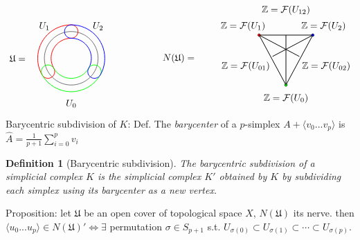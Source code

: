 \documentclass{article}
\theoremstyle{mystyle}
\newtheorem*{definition}{Definition}%
\theoremstyle{remark}
\numberwithin{equation}{section}
\begin{document}
$$
\begin{tikzpicture}
\node () at (-2,0.) {$\mathfrak{U}=$};
\draw (0,0) circle (1);
%
\draw[red,line width=0.25mm] (0,0.75) arc (90:210:0.75);
\draw[red,line width=0.25mm] (0,1.25) arc (90:210:1.25);
\draw[red,line width=0.25mm] (0,1.25) arc (90:-90:0.25);
\draw[red,line width=0.25mm] (-1.0825317,-0.625) arc (210:390:0.25);
%
\draw[green,line width=0.25mm] (-1.0825317,-0.625) arc (210:330:1.25);
\draw[green,line width=0.25mm] (-0.649519,-0.375) arc (210:330:0.75);
\draw[green,line width=0.25mm] (1.0825317,-0.625) arc (-30:150:0.25);
\draw[green,line width=0.25mm] (-1.0825317,-0.625) arc (210:30:0.25);
%
\draw[blue,line width=0.25mm] (0,0.75) arc (90:-30:0.75);
\draw[blue,line width=0.25mm] (0,1.25) arc (90:-30:1.25);
\draw[blue,line width=0.25mm] (0,1.25) arc (90:270:0.25);
\draw[blue,line width=0.25mm] (1.0825317,-0.625) arc (330:150:0.25);
\node () at (4,0.) {$N(\mathfrak{U})=$};
\draw[line width=0.25mm] (-1+8,0.866)--(1+8,0.866);
\draw[line width=0.25mm] (-1+8,0.866)--(8,-1);
\draw[line width=0.25mm] (1+8,0.866)--(8,-1);
\draw[fill=blue] (1+8,0.866) circle (0.05);
\draw[fill=red] (-1+8,0.866) circle (0.05);
\draw[fill=green] (8,-1) circle (0.05);
\node () at (0,-1.7) {$U_0$};
\node () at (8,-1.5) {$\mathbb{Z}=\mathcal{F}(U_0)$};
\node () at (-1,1.2) {$U_1$};
\node () at (8-1.6,1.2) {$\mathbb{Z}=\mathcal{F}(U_1)$};
\node () at (1,1.2) {$U_2$};
\node () at (8+1.4,1.2) {$\mathbb{Z}=\mathcal{F}(U_2)$};
\node () at (8+1.5,-0.3) {$\mathbb{Z}=\mathcal{F}(U_{02})$};
\node () at (8,1.8) {$\mathbb{Z}=\mathcal{F}(U_{12})$};
\node () at (8-1.5,-0.3) {$\mathbb{Z}=\mathcal{F}(U_{01})$};

\draw[line width=0.25mm] (-1+8,0.866)--(8+1/2,0.067);
\draw[line width=0.25mm] (1+8,0.866)--(8-1/2,0.067);
\draw[line width=0.25mm] (8,0.866)--(8,-1);
\end{tikzpicture}
$$
Barycentric subdivision of $K$:
Def. The \emph{barycenter }of a $p$-simplex $A+ \langle v_0...v_p\rangle$ is $\hat{A} = \frac{1}{p+1} \sum_{i=0}^p v_i$ 

\begin{definition}[Barycentric subdivision] The \emph{barycentric subdivision} of a simplicial complex $K$ is the simplicial complex $K'$ obtained by $K$ by subdividing each simplex using its barycenter as a new vertex.
\end{definition}

Proposition: let $\mathfrak{U}$ be an open cover of topological space $X$, $N(\mathfrak{U})$ its nerve. then $\langle u_0...u_p\rangle \in N(\mathfrak{U})' \Leftrightarrow \exists$ permutation $\sigma \in S_{p+1}$ s.t. $U_{\sigma(0)}\subset U_{\sigma(1)}\subset \cdots \subset U_{\sigma(p)}$. 
\end{document}
